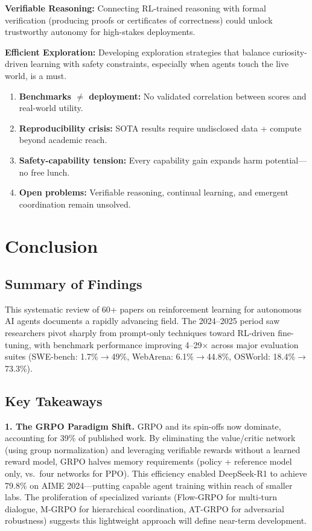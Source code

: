 \documentclass[12pt,a4paper]{report}
\theoremstyle{definition}
\begin{document}
\textbf{Verifiable Reasoning:} Connecting RL-trained reasoning with formal verification (producing proofs or certificates of correctness) could unlock trustworthy autonomy for high-stakes deployments.

\textbf{Efficient Exploration:} Developing exploration strategies that balance curiosity-driven learning with safety constraints, especially when agents touch the live world, is a must.

\begin{tcolorbox}[colback=red!5!white, colframe=red!60!black, title=\textbf{Chapter 6 Key Takeaways}]
\begin{enumerate}
    \item \textbf{Benchmarks $\neq$ deployment:} No validated correlation between scores and real-world utility.
    \item \textbf{Reproducibility crisis:} SOTA results require undisclosed data + compute beyond academic reach.
    \item \textbf{Safety-capability tension:} Every capability gain expands harm potential---no free lunch.
    \item \textbf{Open problems:} Verifiable reasoning, continual learning, and emergent coordination remain unsolved.
\end{enumerate}
\end{tcolorbox}

\chapter{Conclusion}
\label{ch:conclusion}

\section*{Summary of Findings}
This systematic review of 60+ papers on reinforcement learning for autonomous AI agents documents a rapidly advancing field. The 2024--2025 period saw researchers pivot sharply from prompt-only techniques toward RL-driven fine-tuning, with benchmark performance improving 4--29$\times$ across major evaluation suites (SWE-bench: 1.7\%$\rightarrow$49\%, WebArena: 6.1\%$\rightarrow$44.8\%, OSWorld: 18.4\%$\rightarrow$73.3\%).

\section*{Key Takeaways}

\noindent\textbf{1. The GRPO Paradigm Shift.} GRPO and its spin-offs now dominate, accounting for 39\% of published work. By eliminating the value/critic network (using group normalization) and leveraging verifiable rewards without a learned reward model, GRPO halves memory requirements (policy + reference model only, vs.\ four networks for PPO). This efficiency enabled DeepSeek-R1 to achieve 79.8\% on AIME 2024---putting capable agent training within reach of smaller labs. The proliferation of specialized variants (Flow-GRPO for multi-turn dialogue, M-GRPO for hierarchical coordination, AT-GRPO for adversarial robustness) suggests this lightweight approach will define near-term development.
\end{document}
